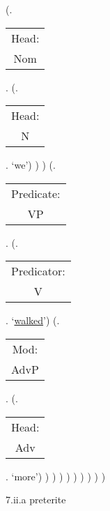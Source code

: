 \documentclass[12pt,letterpaper]{article}
\begin{document}
\begin{figure}
\begin{center}
\begin{parsetree}
			(.\begin{tabular}{c}Head:\\Nom\end{tabular}.
			(.\begin{tabular}{c}Head:\\N\end{tabular}. `we')
			)
			)
			(.\begin{tabular}{c}Predicate:\\VP\end{tabular}.
			(.\begin{tabular}{c}Predicator:\\V\end{tabular}.  `\underline{walked}')
			(.\begin{tabular}{c}Mod:\\AdvP\end{tabular}. 
			(.\begin{tabular}{c}Head:\\Adv\end{tabular}. `more')
			)
			)
			)
			)
			)
			)
			)
			)
			) 
			
		\end{parsetree}
		\hfill \break \hfill \break
		7.ii.a preterite
	\end{center}
\end{figure}
\end{document}
